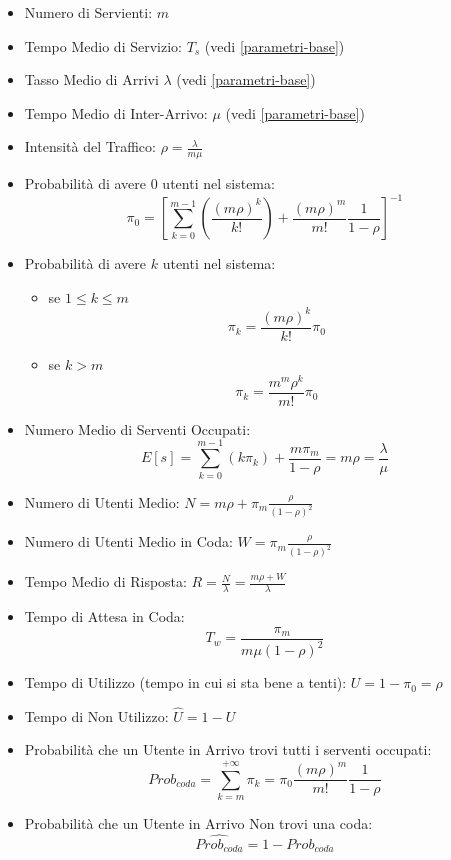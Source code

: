\begin{itemize}
    \item Numero di Servienti: $m$
    \item Tempo Medio di Servizio: $T_s$ (vedi \ref{parametri-base})
    \item Tasso Medio di Arrivi $\lambda$ (vedi \ref{parametri-base})
    \item Tempo Medio di Inter-Arrivo: $\mu$ (vedi \ref{parametri-base})
    \item Intensità del Traffico: $\rho = \frac{\lambda}{m \mu}$
    \item Probabilità di avere $0$ utenti nel sistema:
          $$\pi_0 = \left [ \sum_{k=0}^{m-1} \left ( \frac{(m \rho)^k}{k!}
                  \right ) + \frac{(m \rho)^m}{m!} \frac{1}{1-\rho} \right ]^{-1}$$
    \item Probabilità di avere $k$ utenti nel sistema:
          \begin{itemize}
              \item[\emoji{orangutan}] se $1 \leq k \leq m$ $$\pi_k = \frac{(m
                          \rho)^k}{k!} \pi_0$$
              \item[\emoji{gorilla}] se $k > m$ $$\pi_k = \frac{m^m \rho^k}{m!}
                      \pi_0$$
          \end{itemize}
    \item Numero Medio di Serventi Occupati: $$E[s] = \sum_{k=0}^{m-1} \left (
              k\pi_k \right ) + \frac{m\pi_m}{1-\rho}  = m \rho = \frac{\lambda}{\mu}$$
    \item Numero di Utenti Medio: $N = m \rho + \pi_m \frac{\rho}{(1-\rho)^2}$
    \item Numero di Utenti Medio in Coda: $W = \pi_m \frac{\rho}{(1-\rho)^2}$
    \item Tempo Medio di Risposta: $R = \frac{N}{\lambda} = \frac{m \rho +
                  W}{\lambda}$
    \item Tempo di Attesa in Coda: $$T_w = \frac{\pi_m}{m\mu (1-\rho)^2}$$
    \item Tempo di Utilizzo (tempo in cui si sta bene a tenti): $U = 1 - \pi_0 =
              \rho$
    \item Tempo di Non Utilizzo: $\hat{U} = 1 - U$
    \item Probabilità che un Utente in Arrivo trovi tutti i serventi occupati:
          $$Prob_{coda} = \sum_{k=m}^{+\infty} \pi_k = \pi_0 \frac{(m\rho)^m}{m!}
              \frac{1}{1-\rho}$$
    \item Probabilità che un Utente in Arrivo Non trovi una coda:
          $$\hat{Prob_{coda}} = 1 - Prob_{coda}$$
\end{itemize}

